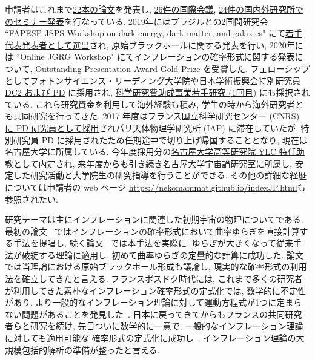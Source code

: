 \documentclass[11pt,a4paper,uplatex,dvipdfmx]{ujarticle} 		%
\newcommand{\研究課題名}{曲率ゆらぎの統計と原始ブラックホール量の精密対応}
\newcommand{\研究機関名}{名古屋大学}
\newcommand{\研究代表者氏名}{多田祐一郎}
\newcommand{\研究期間の最終元号年度}{4}  %
\begin{document}
申請者はこれまで\ul{22本の論文}を発表し, \ul{26件の国際会議}, \ul{24件の国内外研究所でのセミナー発表}を行なっている.
2019年にはブラジルとの2国間研究会 ``FAPESP-JSPS Workshop on dark energy, dark matter, and galaxies"
にて\ul{若手代表発表者として選出}され, 原始ブラックホールに関する発表を行い,
2020年には ``Online JGRG Workshop" にてインフレーションの確率形式に関する発表について, \ul{Outstanding Presentation Award Gold Prize} を受賞した. 
フェローシップとして\ul{フォトンサイエンス・リーディング大学院}や\ul{日本学術振興会特別研究員 DC2 および PD} に採用され,
\ul{科学研究費助成事業若手研究 (1回目)} にも採択されている.
これら研究資金を利用して海外経験も積み, 学生の時から海外研究者とも共同研究を行ってきた. 
2017 年度は\ul{フランス国立科学研究センター (CNRS) に PD 研究員として採用}されパリ天体物理学研究所 (IAP) に滞在していたが, 
特別研究員 PD に採用されたため任期途中で切り上げ帰国することとなり, 現在は名古屋大学に所属している.
今年度採用分の\ul{名古屋大学高等研究院 YLC 特任助教として内定}され, 来年度からも引き続き名古屋大学宇宙論研究室に所属し,
安定した研究活動と大学院生の研究指導を行うことができる.
その他の詳細な経歴については申請者の web ページ \url{https://nekomammat.github.io/indexJP.html}も参照されたい.

研究テーマは主にインフレーションに関連した初期宇宙の物理についてである.
最初の論文~\cite{Fujita:2013cna} ではインフレーションの確率形式において曲率ゆらぎを直接計算する手法を提唱し,
続く論文~\cite{Fujita:2014tja} では本手法を実際に, ゆらぎが大きくなって従来手法が破綻する理論に適用し, 初めて曲率ゆらぎの定量的な計算に成功した.
論文~\cite{Kawasaki:2015ppx} では当理論における原始ブラックホール形成も議論し, 現実的な確率形式の利用法を確立してきたと言える.
フランスポスドク時代には, これまで多くの研究者が利用してきた素朴なインフレーション確率形式の定式化では, 数学的に不定性があり,
より一般的なインフレーション理論に対して運動方程式が1つに定まらない問題があることを発見した~\cite{Pinol:2018euk}.
日本に戻ってきてからもフランスの共同研究者らと研究を続け, 先日ついに数学的に一意で, 一般的なインフレーション理論に対しても適用可能な
確率形式の定式化に成功し~\cite{Pinol:2020cdp}, インフレーション理論の大規模包括的解析の準備が整ったと言える.
\end{document}
